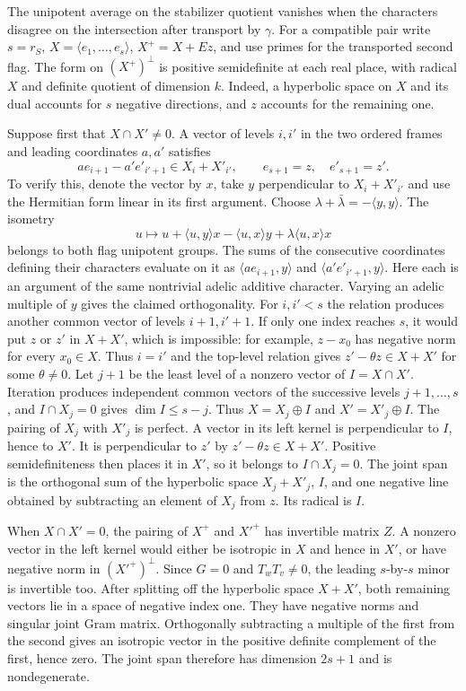 The unipotent average on the stabilizer quotient vanishes when the
characters disagree on the intersection after transport by \(\gamma\).
For a compatible pair write \(s=r_S\), \(X=\langle e_1,\ldots,e_s\rangle\),
\(X^+=X+Ez\), and use primes for the transported second flag.
The form on \((X^+)^\perp\) is positive semidefinite at each real
place, with radical \(X\) and definite quotient of dimension \(k\).
Indeed, a hyperbolic space on \(X\) and its dual accounts for \(s\)
negative directions, and \(z\) accounts for the remaining one.

Suppose first that \(X\cap X'\ne0\). A vector of levels \(i,i'\)
in the two ordered frames and leading coordinates \(a,a'\) satisfies
\[
 a e_{i+1}-a'e'_{i'+1}\in X_i+X'_{i'},\qquad
 e_{s+1}=z,\quad e'_{s+1}=z'.
\]
To verify this, denote the vector by \(x\), take \(y\) perpendicular
to \(X_i+X'_{i'}\) and use the Hermitian form linear in its first
argument. Choose \(\lambda+\bar\lambda=-\langle y,y\rangle\). The isometry
\[
 u\longmapsto u+\langle u,y\rangle x-\langle u,x\rangle y
                 +\lambda\langle u,x\rangle x
\]
belongs to both flag unipotent groups. The sums of the consecutive
coordinates defining their characters evaluate on it as
\(\langle ae_{i+1},y\rangle\) and \(\langle a'e'_{i'+1},y\rangle\).
Here each is an argument of the same nontrivial adelic additive
character. Varying an adelic multiple of \(y\) gives the claimed
orthogonality. For \(i,i'<s\) the relation produces another common
vector of levels \(i+1,i'+1\). If only one index reaches \(s\), it
would put \(z\) or \(z'\) in \(X+X'\), which is impossible: for
example, \(z-x_0\) has negative norm for every \(x_0\in X\).
Thus \(i=i'\) and the top-level relation gives
\(z'-\theta z\in X+X'\) for some \(\theta\ne0\).
Let \(j+1\) be the least level of a nonzero vector of \(I=X\cap X'\).
Iteration produces independent common vectors of the successive levels
\(j+1,\ldots,s\), and \(I\cap X_j=0\) gives \(\dim I\le s-j\).
Thus \(X=X_j\oplus I\) and \(X'=X'_j\oplus I\).
The pairing of \(X_j\) with \(X'_j\) is perfect. A vector in its left
kernel is perpendicular to \(I\), hence to \(X'\). It is perpendicular
to \(z'\) by \(z'-\theta z\in X+X'\). Positive semidefiniteness then
places it in \(X'\), so it belongs to \(I\cap X_j=0\).
The joint span is the orthogonal sum of the hyperbolic space
\(X_j+X'_j\), \(I\), and one negative line obtained by subtracting
an element of \(X_j\) from \(z\). Its radical is \(I\).

When \(X\cap X'=0\), the pairing of \(X^+\) and \(X'^+\) has
invertible matrix \(Z\). A nonzero vector in the left kernel would
either be isotropic in \(X\) and hence in \(X'\), or have negative
norm in \((X'^+)^\perp\). Since \(G=0\) and \(T_wT_v\ne0\), the
leading \(s\)-by-\(s\) minor is invertible too. After splitting off
the hyperbolic space \(X+X'\), both remaining vectors lie in a space
of negative index one. They have negative norms and singular joint
Gram matrix. Orthogonally subtracting a multiple of the first from
the second gives an isotropic vector in the positive definite
complement of the first, hence zero. The joint span therefore has
dimension \(2s+1\) and is nondegenerate.

